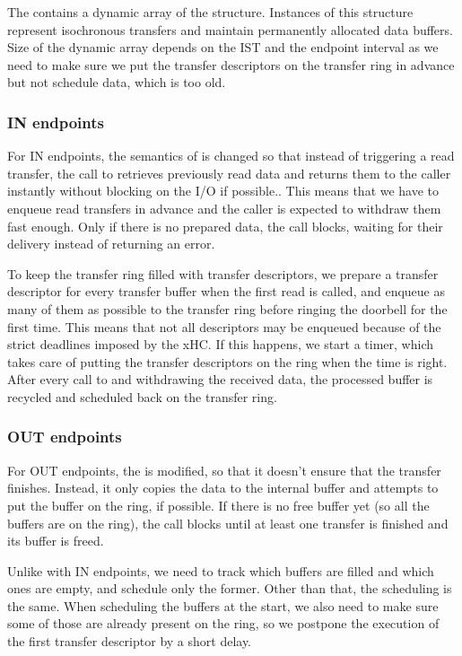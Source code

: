 The  contains a dynamic array of the
 structure. Instances of this structure represent isochronous transfers and
maintain permanently allocated data buffers. Size of the dynamic array depends on
the IST and the endpoint interval as we need to make sure we put the transfer
descriptors on the transfer ring in advance but not schedule data, which is too old.

\subsubsection{IN endpoints}

For IN endpoints, the semantics of  is changed so that instead
of triggering a read transfer, the call to  retrieves previously read data and
returns them to the caller instantly without blocking on the I/O if possible.. This means that we have to enqueue read transfers
in advance and the caller is expected to withdraw them fast enough. Only if there is
no prepared data, the call blocks, waiting for their delivery instead of returning an
error.

To keep the transfer ring filled with transfer descriptors, we prepare a
transfer descriptor for every transfer buffer when the first read is called, and
enqueue as many of them as possible to the transfer ring before ringing the doorbell
for the first time. This means that not all descriptors may be enqueued because
of the strict deadlines imposed by the xHC. If this happens, we start a timer,
which takes care of putting the transfer descriptors on the ring when the time
is right. After every call to  and withdrawing the received data,
the processed buffer is recycled and scheduled back on the transfer ring.

\subsubsection{OUT endpoints}

For OUT endpoints, the  is modified, so that it doesn't ensure that the transfer
finishes. Instead, it only copies the data to the internal buffer and attempts to put
the buffer on the ring, if possible. If there is no free buffer yet (so all the
buffers are on the ring), the call blocks until at least one transfer is
finished and its buffer is freed.

Unlike with IN endpoints, we need to track which buffers are filled and which ones
are empty, and schedule only the former. Other than that, the scheduling is
the same. When scheduling the buffers at the start, we also need to make sure
some of those are already present on the ring, so we postpone the execution of
the first transfer descriptor by a short delay.

